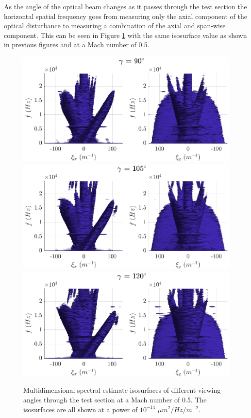 As the angle of the optical beam changes as it passes through the test section the horizontal spatial frequency goes from measuring only the axial component of the optical disturbance to measuring a combination of the axial and span-wise component.
This can be seen in Figure \ref{fig:04_dispersion_angle} with the same isosurface value as shown in previous figures and at a Mach number of 0.5.
\begin{figure}
  \centering
  \includegraphics{../matlab/04_dispersion_analysis/dispersion_angle_90.eps}
  \includegraphics{../matlab/04_dispersion_analysis/dispersion_angle_105.eps}
  \includegraphics{../matlab/04_dispersion_analysis/dispersion_angle_120.eps}
  \caption{Multidimensional spectral estimate isosurfaces of different viewing angles through the test section at a Mach number of 0.5. The isosurfaces are all shown at a power of $10^{-14}$ $\mu m^2/Hz/m^{-2}$.}
  \label{fig:04_dispersion_angle}
\end{figure}
